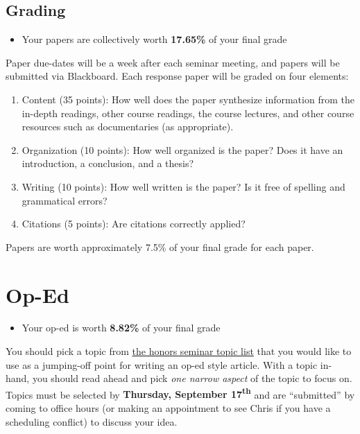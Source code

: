 \documentclass[
]{book}
\providecommand{\tightlist}{%
  \setlength{\itemsep}{0pt}\setlength{\parskip}{0pt}}
\newenvironment{rmdblock}[1]
  {\begin{shaded*}
  \begin{itemize}
  \renewcommand{\labelitemi}{
    \raisebox{-.7\height}[0pt][0pt]{
      {\setkeys{Gin}{width=3em,keepaspectratio}\texttt{[image: images/\#1]}}
    }
  }
  \item
  }
  {
  \end{itemize}
  \end{shaded*}
  }
\newenvironment{rmdtip}
  {\begin{rmdblock}{tip}}
  {\end{rmdblock}}
\begin{document}
\hypertarget{grading}{%
\subsection{Grading}\label{grading}}

\begin{rmdtip}
Your papers are collectively worth \textbf{17.65\%} of your final grade
\end{rmdtip}

Paper due-dates will be a week after each seminar meeting, and papers will be submitted via Blackboard. Each response paper will be graded on four elements:

\begin{enumerate}
\def\labelenumi{\arabic{enumi}.}
\tightlist
\item
  Content (35 points): How well does the paper synthesize information from the in-depth readings, other course readings, the course lectures, and other course resources such as documentaries (as appropriate).
\item
  Organization (10 points): How well organized is the paper? Does it have an introduction, a conclusion, and a thesis?
\item
  Writing (10 points): How well written is the paper? Is it free of spelling and grammatical errors?
\item
  Citations (5 points): Are citations correctly applied?
\end{enumerate}

Papers are worth approximately 7.5\% of your final grade for each paper.

\hypertarget{op-ed}{%
\section{Op-Ed}\label{op-ed}}

\begin{rmdtip}
Your op-ed is worth \textbf{8.82\%} of your final grade
\end{rmdtip}

You should pick a topic from \href{/honors-seminar-topics.html}{the honors seminar topic list} that you would like to use as a jumping-off point for writing an op-ed style article. With a topic in-hand, you should read ahead and pick \emph{one narrow aspect} of the topic to focus on. Topics must be selected by \textbf{Thursday, September 17\textsuperscript{th}} and are ``submitted'' by coming to office hours (or making an appointment to see Chris if you have a scheduling conflict) to discuss your idea.
\end{document}
